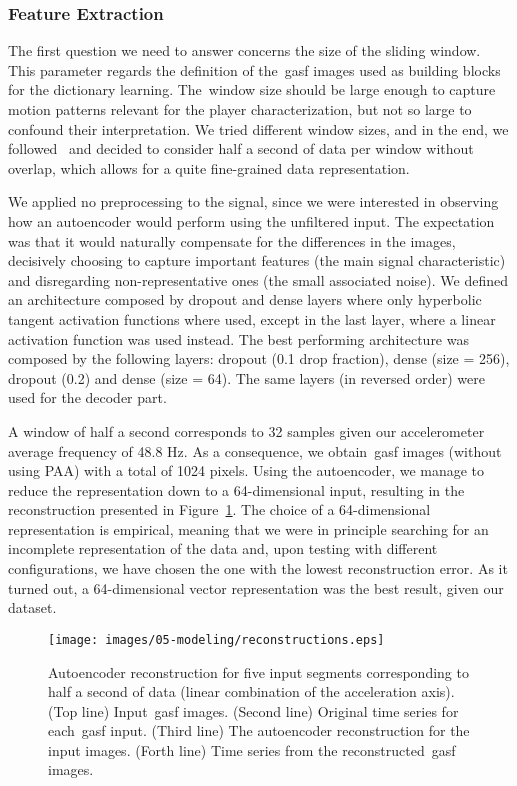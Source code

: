 \subsubsection{Feature Extraction}

The first question we need to answer concerns the size of the sliding window. This parameter regards the definition of the~\gls{gasf} images used as building blocks for the dictionary learning. The~window size should be large enough to capture motion patterns relevant for the player characterization, but not so large to confound their interpretation. We tried different window sizes, and in the end, we followed~\cite{oliveira_activity_2017} and decided to consider half a second of data per window without overlap, which allows for a quite fine-grained data representation.

We applied no preprocessing to the signal, since we were interested in observing how an autoencoder would perform using the unfiltered input. The expectation was that it would naturally compensate for the differences in the images, decisively choosing to capture important features (the main signal characteristic) and disregarding non-representative ones (the small associated noise). We defined an architecture composed by dropout and dense layers where only hyperbolic tangent activation functions where used, except in the last layer, where a linear activation function was used instead. The best performing architecture was composed by the following layers: dropout (0.1 drop fraction), dense (size = 256), dropout (0.2) and dense (size = 64). The same layers (in reversed order) were used for the decoder part.

A window of half a second corresponds to 32 samples given our accelerometer average frequency of 48.8 Hz. As a consequence, we obtain~\gls{gasf} images (without using PAA) with a total of 1024 pixels. Using the autoencoder, we manage to reduce the representation down to a 64-dimensional input, resulting in the reconstruction presented in Figure~\ref{figure:reconstruction}. The choice of a 64-dimensional representation is empirical, meaning that we were in principle searching for an incomplete representation of the data and, upon testing with different configurations, we have chosen the one with the lowest reconstruction error. As it turned out, a 64-dimensional vector representation was the best result, given our dataset. 

\begin{figure}[H]
	\centering
	\texttt{[image: images/05-modeling/reconstructions.eps]}
	\caption{Autoencoder reconstruction for five input segments corresponding to half a second of data (linear combination of the acceleration axis). ({Top line}) Input~\gls{gasf} images. ({Second line}) Original time series for each~\gls{gasf} input. ({Third line}) The autoencoder reconstruction for the input images. ({Forth line}) Time series from the reconstructed~\gls{gasf} images.}
  \label{figure:reconstruction}
\end{figure}

